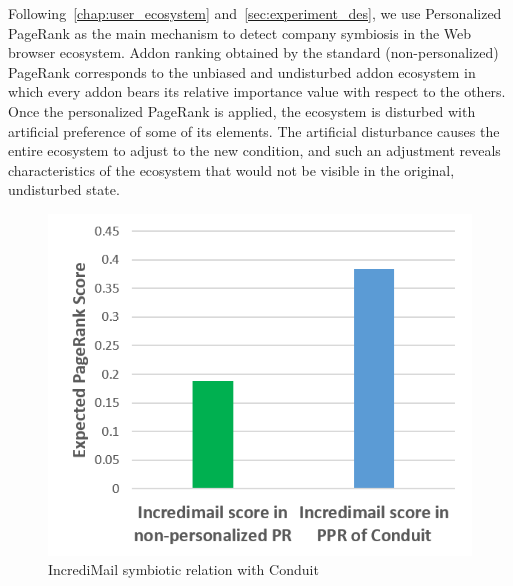 \documentclass[11pt,oneside]{book}
\begin{document}
Following~\autoref{chap:user_ecosystem} and~\autoref{sec:experiment_des}, we use Personalized PageRank as the main mechanism to detect company symbiosis in the Web browser ecosystem. Addon ranking obtained by the standard (non-personalized) PageRank corresponds to the unbiased and undisturbed addon ecosystem in which every addon bears its relative importance value with respect to the others. Once the personalized PageRank is applied, the ecosystem is disturbed with artificial preference of some of its elements. The artificial disturbance causes the entire ecosystem to adjust to the new condition, and such an adjustment reveals characteristics of the ecosystem that would not be visible in the original, undisturbed state. 

\iffalse
\begin{figure}[!htbp]
\centering
\includegraphics[width=\linewidth]{figures/incredi_sym_conduit.png}
\caption{IncrediMail symbiotic relation with Conduit}
\label{fig:incredimail_sym_conduit}
\end{figure}
\end{document}
